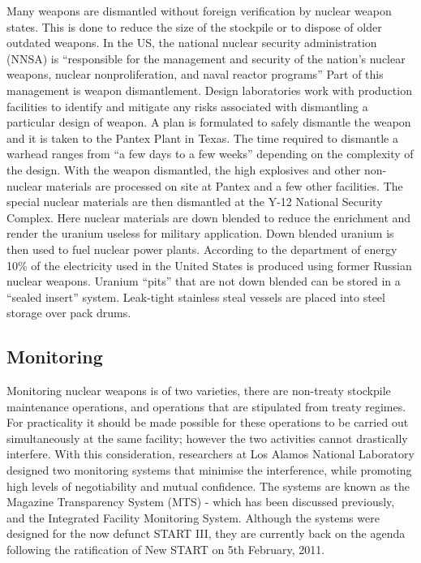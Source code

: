 \documentclass[twoside,titlepage,11pt,twocolumn,a4paper]{article}
\begin{document}
Many weapons are dismantled without foreign verification by nuclear
weapon states.  This is done to reduce the size of the stockpile or to
dispose of older outdated weapons.  In the US, the national nuclear
security administration (NNSA) is ``responsible for the management and
security of the nation's nuclear weapons, nuclear nonproliferation,
and naval reactor programs'' \citep{gerdes2001} Part of this
management is weapon dismantlement. Design laboratories work with
production facilities to identify and mitigate any risks associated
with dismantling a particular design of weapon. A plan is formulated
to safely dismantle the weapon and it is taken to the Pantex Plant in
Texas. The time required to dismantle a warhead ranges from ``a few
days to a few weeks'' depending on the complexity of the
design.\citep{ourMissionNNSA} With the weapon dismantled, the high
explosives and other non-nuclear materials are processed on site at
Pantex and a few other facilities.  The special nuclear materials are
then dismantled at the Y-12 National Security Complex.
\citep{pantex2010} Here nuclear materials are down blended to reduce
the enrichment and render the uranium useless for military
application. Down blended uranium is then used to fuel nuclear power
plants. According to the department of energy 10\% of the electricity
used in the United States is produced using former Russian nuclear
weapons. \citep{dismantlementNNSA} Uranium ``pits'' that are not down
blended can be stored in a ``sealed insert'' system. Leak-tight
stainless steal vessels are placed into steel storage over pack drums.

\subsection{Monitoring}
Monitoring nuclear weapons is of two varieties, there are non-treaty 
stockpile maintenance operations, and operations that are stipulated 
from treaty regimes. For practicality it should be made possible for 
these operations to be carried out simultaneously at the same facility; 
however the two activities cannot drastically interfere. With this 
consideration, researchers at Los Alamos National Laboratory designed 
two monitoring systems that minimise the interference, while promoting 
high levels of negotiability and mutual confidence. The systems are 
known as the Magazine Transparency System (MTS) - which has been 
discussed previously, and the Integrated Facility Monitoring System. 
Although the systems were designed for the now defunct START III, 
they are currently back on the agenda following the ratification of 
New START on 5th February, 2011. 
\end{document}
